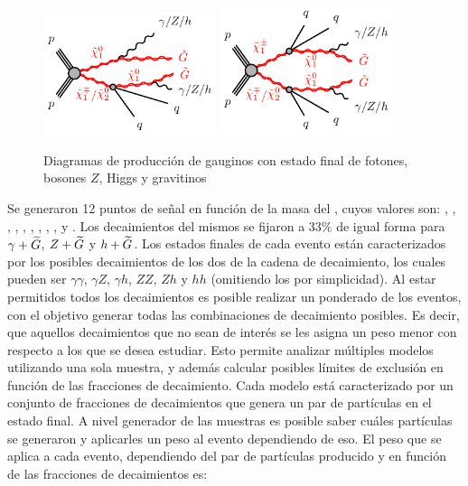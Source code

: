 \begin{figure}
  \centering
  \includegraphics[width=0.45\textwidth]{images/analysis_EWK/N1N2C1-qqZhphGG-GGM.pdf}%
  \includegraphics[width=0.45\textwidth]{images/analysis_EWK/C1C1N2-qqqqZhphGG-GGM.pdf}
  \caption{Diagramas de producción de gauginos con estado final de fotones, bosones $Z$, Higgs y gravitinos}
  \label{fig:EWK_GGM_diagrams}
\end{figure}


Se generaron 12 puntos de señal en función de la masa del \ninoone, cuyos valores son: , , , , , , , , ,  y . Los decaimientos del mismos se fijaron a $33\%$ de igual forma para $\gamma + \widetilde{G}$, $Z + \widetilde{G}$ y $h + \widetilde{G}$. Los estados finales de cada evento están caracterizados por los posibles decaimientos de los dos \ninoone de la cadena de decaimiento, los cuales pueden ser $\gamma\gamma$, $\gamma Z$, $\gamma h$, $ZZ$, $Zh$ y $hh$ (omitiendo los \gravino por simplicidad). Al estar permitidos todos los decaimientos es posible realizar un ponderado de los eventos, con el objetivo generar todas las combinaciones de decaimiento posibles. Es decir, que aquellos decaimientos que no sean de interés se les asigna un peso menor con respecto a los que se desea estudiar. Esto permite analizar múltiples modelos utilizando una sola muestra, y además calcular posibles límites de exclusión en función de las fracciones de decaimiento.
Cada modelo está caracterizado por un conjunto de fracciones de decaimientos que genera un par de partículas en el estado final. A nivel generador de las muestras es posible saber cuáles partículas se generaron y aplicarles un peso al evento dependiendo de eso. El peso que se aplica a cada evento, dependiendo del par de partículas producido y en función de las fracciones de decaimientos es:


